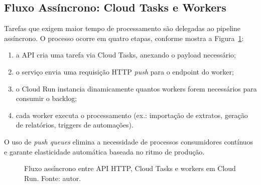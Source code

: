 \subsection{Fluxo Assíncrono: Cloud Tasks e Workers}

Tarefas que exigem maior tempo de processamento são delegadas ao pipeline assíncrono.
O processo ocorre em quatro etapas, conforme mostra a Figura~\ref{fig:fluxo-assincrono}:

\begin{enumerate}
    \item a API cria uma tarefa via Cloud Tasks, anexando o payload necessário;
    \item o serviço envia uma requisição HTTP \textit{push} para o endpoint do worker;
    \item o Cloud Run instancia dinamicamente quantos workers forem necessários para consumir o backlog;
    \item cada worker executa o processamento (ex.: importação de extratos, geração de relatórios, triggers de automações).
\end{enumerate}

O uso de \textit{push queues} elimina a necessidade de processos consumidores contínuos
e garante elasticidade automática baseada no ritmo de produção.


\begin{figure}[htbp]
    \centering
    \caption{Fluxo assíncrono entre API HTTP, Cloud Tasks e workers em Cloud Run. Fonte: autor.}
    \label{fig:fluxo-assincrono}
\end{figure}

